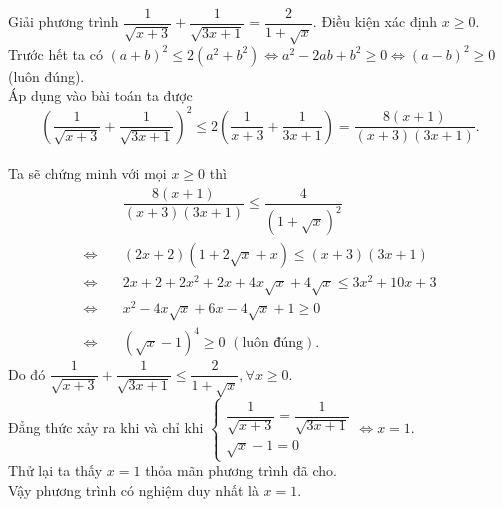 \begin{ex}%
Giải phương trình $\dfrac{1}{\sqrt{x+3}}+\dfrac{1}{\sqrt{3x+1}}=\dfrac{2}{1+\sqrt{x}}.$
	\loigiai
	{Điều kiện xác định $x\ge 0$.\\
	Trước hết ta có $(a+b)^2\le 2(a^2+b^2) \Leftrightarrow a^2-2ab+b^2 \ge 0 \Leftrightarrow (a-b)^2 \ge 0$ (luôn đúng).\\
	Áp dụng vào bài toán ta được
	$$\left(\dfrac{1}{\sqrt{x+3}}+\dfrac{1}{\sqrt{3x+1}}\right)^2 \le 2\left(\dfrac{1}{x+3}+\dfrac{1}{3x+1}\right)=\dfrac{8(x+1)}{(x+3)(3x+1)}.$$\\
	Ta sẽ chứng minh với mọi $x\ge 0$ thì 
	\begin{align*}
	& \dfrac{8(x+1)}{(x+3)(3x+1)} \le \dfrac{4}{(1+\sqrt{x})^2} \\
	\Leftrightarrow \quad & (2x+2)(1+2\sqrt{x}+x) \le (x+3)(3x+1)\\
	\Leftrightarrow \quad & 2x+2+2x^2+2x+4x\sqrt{x}+4\sqrt{x} \le 3x^2+10x+3\\
	\Leftrightarrow \quad & x^2-4x\sqrt{x}+6x-4\sqrt{x}+1 \ge 0\\
	\Leftrightarrow \quad & \left(\sqrt{x}-1\right)^4 \ge 0 \,\,(\text{luôn đúng}).
	\end{align*}
	Do đó $\dfrac{1}{\sqrt{x+3}}+\dfrac{1}{\sqrt{3x+1}}\le \dfrac{2}{1+\sqrt{x}}, \forall x \ge 0$.\\
	Đẳng thức xảy ra khi và chỉ khi $\begin{cases}\dfrac{1}{\sqrt{x+3}}=\dfrac{1}{\sqrt{3x+1}}\\\sqrt{x}-1=0\end{cases} \Leftrightarrow x=1$.\\
	Thử  lại ta thấy $x=1$ thỏa mãn phương trình đã cho. \\
	Vậy phương trình có nghiệm duy nhất là $x=1$.
	}
\end{ex}

